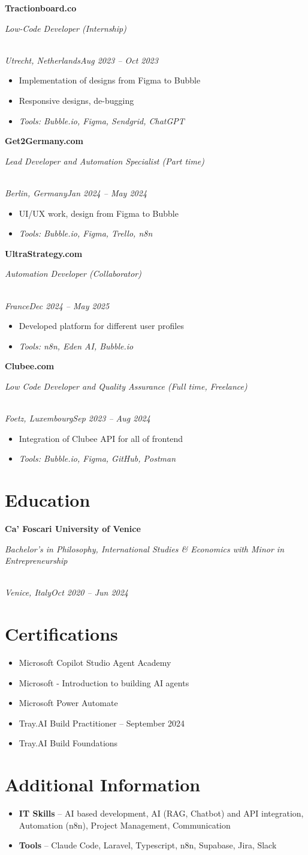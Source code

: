 \documentclass[a4paper,10pt]{article}
\newcommand{\role}[4]{\vspace{3pt}\noindent\hspace{0.6em}\parbox[t]{0.38\textwidth}{\raggedright\textbf{#1}}\hfill\parbox[t]{0.58\textwidth}{\raggedleft\textit{#2}}\\{\textit{#3}\hfill\textit{#4}}\vspace{1pt}}
\begin{document}
\role{Tractionboard.co}{Low-Code Developer (Internship)}{Utrecht, Netherlands}{Aug 2023 -- Oct 2023}
\begin{itemize}
\item Implementation of designs from Figma to Bubble
\item Responsive designs, de-bugging
\item \textit{Tools: Bubble.io, Figma, Sendgrid, ChatGPT}
\end{itemize}

\role{Get2Germany.com}{Lead Developer and Automation Specialist (Part time)}{Berlin, Germany}{Jan 2024 -- May 2024}
\begin{itemize}
\item UI/UX work, design from Figma to Bubble
\item \textit{Tools: Bubble.io, Figma, Trello, n8n}
\end{itemize}

\role{UltraStrategy.com}{Automation Developer (Collaborator)}{France}{Dec 2024 -- May 2025}
\begin{itemize}
\item Developed platform for different user profiles
\item \textit{Tools: n8n, Eden AI, Bubble.io}
\end{itemize}

\role{Clubee.com}{Low Code Developer and Quality Assurance (Full time, Freelance)}{Foetz, Luxembourg}{Sep 2023 -- Aug 2024}
\begin{itemize}
\item Integration of Clubee API for all of frontend
\item \textit{Tools: Bubble.io, Figma, GitHub, Postman}
\end{itemize}

\section{Education}
\role{Ca' Foscari University of Venice}{Bachelor's in Philosophy, International Studies \& Economics with Minor in Entrepreneurship}{Venice, Italy}{Oct 2020 -- Jun 2024}

\section{Certifications}
\begin{itemize}
\item Microsoft Copilot Studio Agent Academy
\item Microsoft - Introduction to building AI agents
\item Microsoft Power Automate
\item Tray.AI Build Practitioner -- September 2024
\item Tray.AI Build Foundations
\end{itemize}

\section{Additional Information}
\begin{itemize}
\item \textbf{IT Skills} -- AI based development, AI (RAG, Chatbot) and API integration, Automation (n8n), Project Management, Communication
\item \textbf{Tools} -- Claude Code, Laravel, Typescript, n8n, Supabase, Jira, Slack
\end{itemize}
\end{document}
